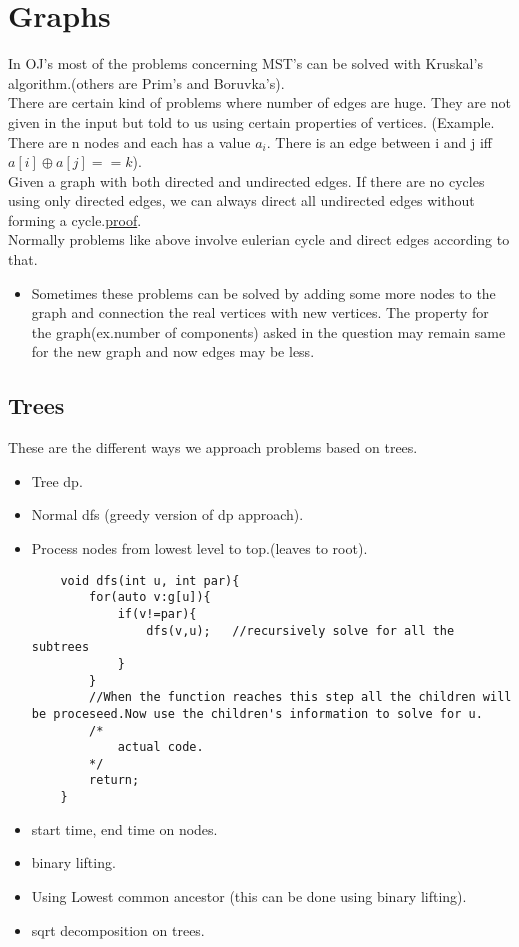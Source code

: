 \documentclass[../Notes.tex]{subfiles}
\begin{document}
\chapter{Graphs}

In OJ's most of the problems concerning MST's can be solved with Kruskal's algorithm.(others are Prim's and Boruvka's).\\ 

There are certain kind of problems where number of edges are huge. They are not given in the input but told to us using certain properties of vertices. (Example. There are n nodes and each has a value $a_{i}$. There is an edge between i and j iff $a[i]\oplus a[j]==k$).\\

Given a graph with both directed and undirected edges. If there are no cycles using only directed edges, we can always direct all undirected edges without forming a cycle.\href{./Material/Making undirected edges direct.pdf}{proof}.\\
Normally problems like above involve eulerian cycle and direct edges according to that.

\begin{itemize}
	\item Sometimes these problems can be solved by adding some more nodes to the graph and connection the real vertices with new vertices. The property for the graph(ex.number of components) asked in the question may remain same for the new graph and now edges may be less.
\end{itemize}

\section{Trees}

These are the different ways we approach problems based on trees.
\begin{itemize}
	\item Tree dp.
	\item Normal dfs (greedy version of dp approach).
	\item Process nodes from lowest level to top.(leaves to root).
	\pagebreak
	\begin{lstlisting}
	void dfs(int u, int par){
		for(auto v:g[u]){
			if(v!=par){
				dfs(v,u);	//recursively solve for all the subtrees
			}
		}
		//When the function reaches this step all the children will be proceseed.Now use the children's information to solve for u.
		/*
			actual code.
		*/
		return;
	}
	\end{lstlisting}
	\item start time, end time on nodes.
	\item binary lifting.
	\item Using Lowest common ancestor (this can be done using binary lifting).
	\item sqrt decomposition on trees.
\end{itemize}
\end{document}
